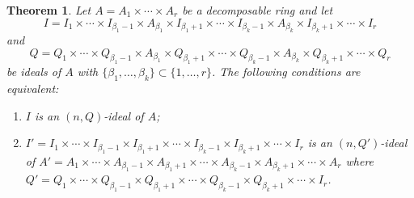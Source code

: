 \documentclass[10pt,a4paper]{amsart}
\newtheorem{theorem}{Theorem}[section]
\numberwithin{equation}{section}
\begin{document}
\begin{theorem} \label{6}
Let $A= A_1 \times \cdots \times A_r$ be a decomposable ring and let \[ I = I_1 \times \cdots \times I_{\beta_1-1} \times A_{\beta_1} \times I_{\beta_1+1} \times \cdots \times I_{\beta_k-1} \times A_{\beta_k} \times I_{\beta_k+1} \times \cdots \times I_r \] and \[ Q = Q_1 \times \cdots \times Q_{\beta_1-1} \times A_{\beta_1} \times Q_{\beta_1+1} \times \cdots \times Q_{\beta_k-1} \times A_{\beta_k} \times Q_{\beta_k+1} \times \cdots \times Q_r \]be   ideals of $A$ with    $\{\beta_1, \dots, \beta_k\} \subset \{1, \dots, r\}$.  The following conditions are equivalent:
 \begin{enumerate} 
 \item[(1)] $I$ is an $(n,Q)$-ideal of $A$; 
 \item[(2)] $I'  = I_1 \times \cdots \times I_{\beta_1-1} \times I_{\beta_1+1} \times \cdots \times I_{\beta_k-1} \times I_{\beta_k+1} \times \cdots \times I_r$ is an $(n,Q')$-ideal of $A' =A_1 \times \cdots \times A_{\beta_1-1} \times A_{\beta_1+1} \times \cdots \times A_{\beta_k-1} \times A_{\beta_k+1} \times \cdots \times A_r$ where $Q'=Q_1 \times \cdots \times Q_{\beta_1-1} \times Q_{\beta_1+1} \times \cdots \times Q_{\beta_k-1} \times Q_{\beta_k+1} \times \cdots \times I_r$.
  \end{enumerate}
\end{theorem}
\end{document}
